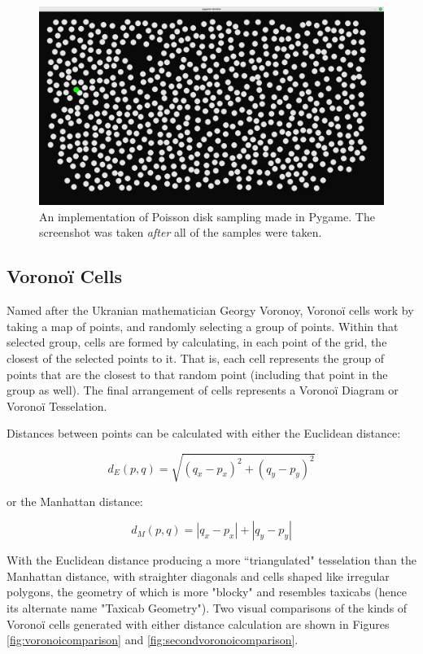 \begin{figure}[H]
    \centering
    \includegraphics[width=\textwidth]{Images/pygamepoissonsample.png}
    \caption{An implementation of Poisson disk sampling made in Pygame.\cite{pygamepoissondisksampling} The screenshot was taken \textit{after} all of the samples were taken.}
    \label{fig:pygamepoisson}
\end{figure}

\subsection{Voronoï Cells}

Named after the Ukranian mathematician Georgy Voronoy, Voronoï cells work by taking a map of points, and randomly selecting a group of points. Within that selected group, cells are formed by calculating, in each point of the grid, the closest of the selected points to it. That is, each cell represents the group of points that are the closest to that random point (including that point in the group as well).\cite{pcgwikivoronoi} The final arrangement of cells represents a Voronoï Diagram or Voronoï Tesselation.

Distances between points can be calculated with either the Euclidean distance:

$$ d_{E}(p, q) = \sqrt{(q_x - p_x)^2 + (q_y - p_y)^2} $$

or the Manhattan distance:

$$ d_{M}(p, q) = |q_x - p_x| + |q_y - p_y| $$

With the Euclidean distance producing a more ``triangulated" tesselation than the Manhattan distance, with straighter diagonals and cells shaped like irregular polygons, the geometry of which is more "blocky" and resembles taxicabs (hence its alternate name "Taxicab Geometry"). Two visual comparisons of the kinds of Voronoï cells generated with either distance calculation are shown in Figures \ref{fig:voronoicomparison} and \ref{fig:secondvoronoicomparison}.


